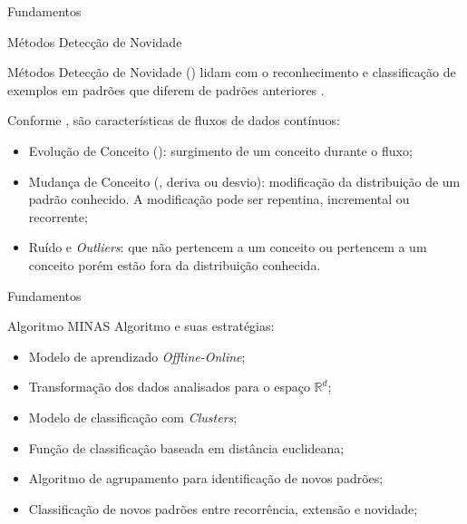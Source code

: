 \documentclass[aspectratio=43,10pt]{beamer}
\newcommand{\nota}[1]{\hspace*{-0.5cm}\textit{{\color[rgb]{1,0,0}Nota: #1}}}
\begin{document}
\begin{frame}[fragile]{Fundamentos}
  \begin{alertblock}{Métodos Detecção de Novidade}
    
    \vspace{1mm}
    Métodos Detecção de Novidade (\novelty) lidam com o reconhecimento e
    classificação de exemplos em padrões que diferem de padrões anteriores
    \cite{PERNER2007,Gama2010}.
  
    Conforme , são características de fluxos de dados contínuos:
    \begin{itemize}[<+- | alert@+>]
      
      \item Evolução de Conceito (\evolution): surgimento de um conceito durante
      o fluxo;
      
      \item Mudança de Conceito (\drift, deriva ou desvio): modificação da
      distribuição de um padrão conhecido. A modificação pode ser repentina,
      incremental ou recorrente;
      
      \item Ruído e \emph{Outliers}: que não pertencem a um conceito ou
      pertencem a um conceito porém estão fora da distribuição conhecida.
      
    \end{itemize}
  \end{alertblock}
\end{frame}

\begin{frame}[fragile]{Fundamentos}
\begin{alertblock}{Algoritmo MINAS}
  \vspace{5mm}
  Algoritmo e suas estratégias:
  \begin{itemize}[<+- | alert@+>]
    \item Modelo de aprendizado \emph{Offline-Online};
    \item Transformação dos dados analisados para o espaço $\mathbb{R}^d$;
    \item Modelo de classificação com \emph{Clusters};
    \item Função de classificação baseada em distância euclideana;
    \item Algoritmo de agrupamento para identificação de novos padrões;
    \item Classificação de novos padrões entre recorrência, extensão e novidade;
  \end{itemize}
\end{alertblock}
\end{frame}
\end{document}
